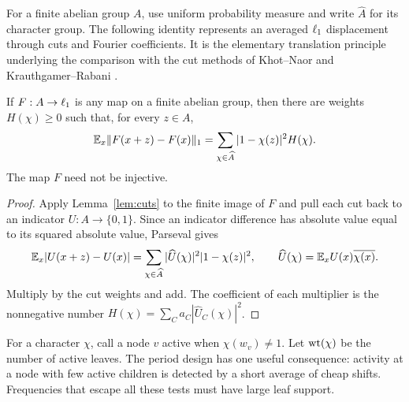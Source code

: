 For a finite abelian group $A$, use uniform probability measure and
write $\widehat A$ for its character group. The following identity
represents an averaged $\ell_1$ displacement through cuts and Fourier
coefficients. It is the elementary translation principle underlying the comparison with the
cut methods of Khot--Naor and Krauthgamer--Rabani
\cite{KhotNaor2006,KrauthgamerRabani2009}.

\begin{lemma}\label{lem:finite-fourier}
If $F:A\to\ell_1$ is any map on a finite abelian group, then there
are weights $H(\chi)\geq0$ such that, for every $z\in A$,
\begin{equation}\label{eq:finite-fourier}
 \mathbb E_x\|F(x+z)-F(x)\|_1
 =\sum_{\chi\in\widehat A}|1-\chi(z)|^2H(\chi).
\end{equation}
The map $F$ need not be injective.
\end{lemma}
\begin{proof}
Apply Lemma~\ref{lem:cuts} to the finite image of $F$ and pull each
cut back to an indicator $U:A\to\{0,1\}$. Since an indicator difference
has absolute value equal to its squared absolute value, Parseval gives
\[
 \mathbb E_x|U(x+z)-U(x)|
 =\sum_{\chi\in\widehat A}
 |\widehat U(\chi)|^2|1-\chi(z)|^2,
 \qquad
 \widehat U(\chi)=\mathbb E_x U(x)\overline{\chi(x)}.
\]
Multiply by the cut weights and add. The coefficient of each multiplier
is the nonnegative number
$H(\chi)=\sum_C a_C|\widehat U_C(\chi)|^2$.
\end{proof}

For a character $\chi$, call a node $v$ active when $\chi(w_v)\ne1$.
Let $\operatorname{wt}(\chi)$ be the number of active leaves. The period design has
one useful consequence: activity at a node with few active children is
detected by a short average of cheap shifts. Frequencies that escape
all these tests must have large leaf support.


